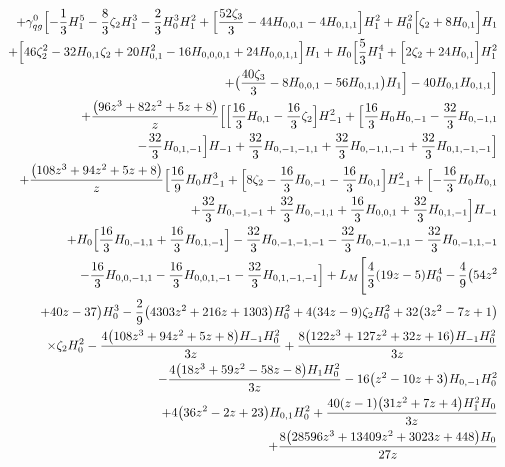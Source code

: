 \begin{eqnarray}
\nonumber \\ &&
+{\gamma}_{qg}^{0}\Bigl[-\frac{1}{3} H_1^5-\frac{8}{3} \zeta_2 H_1^3-\frac{2}{3} H_0^3H_1^2+\Bigl[\frac{52 \zeta_3}{3}-44 H_{0,0,1}-4 H_{0,1,1}\Bigr] H_1^2+H_0^2\Bigl[\zeta_2+8 H_{0,1}\Bigr] H_1
\nonumber \\ &&
+\Bigl[46 \zeta_2^2-32 H_{0,1}\zeta_2+20 H_{0,1}^2-16 H_{0,0,0,1}+24 H_{0,0,1,1}\Bigr] H_1+H_0\Bigl[\frac{5}{3} H_1^4+\Bigl[2 \zeta_2+24 H_{0,1}\Bigr] H_1^2
\nonumber \\ &&
+\big(\frac{40  \zeta_3}{3}-8 H_{0,0,1}-56 H_{0,1,1}\big) H_1\Bigr]-40 H_{0,1}H_{0,1,1}\Bigr]
\nonumber \\ &&
+\frac{\big(96 z^3+82 z^2+5 z+8\big)}{z}
 \Bigl[\Bigl[\frac{16}{3}   H_{0,1}-\frac{16}{3}  \zeta_2\Bigr]  H_{-1}^2+\Bigl[\frac{16}{3} H_0 H_{0,-1}-\frac{32}{3}   H_{0,-1,1}
\nonumber \\ &&
-\frac{32}{3}  H_{0,1,-1}\Bigr] H_{-1}+\frac{32}{3}   H_{0,-1,-1,1}+\frac{32}{3}  H_{0,-1,1,-1}+\frac{32}{3}   H_{0,1,-1,-1}\Bigr]
\nonumber \\ &&
+\frac{\big(108 z^3+94 z^2+5 z+8\big) }{z}
 \Bigl[\frac{16}{9} H_0 H_{-1}^3+\Bigl[8 \zeta_2-\frac{16}{3}  H_{0,-1}-\frac{16}{3} H_{0,1}\Bigr] H_{-1}^2+\Bigl[-\frac{16}{3}  H_0  H_{0,1}
\nonumber \\ &&
+\frac{32}{3} H_{0,-1,-1}+\frac{32}{3} H_{0,-1,1}+\frac{16}{3}   H_{0,0,1}+\frac{32}{3} H_{0,1,-1}\Bigr] H_{-1}
\nonumber \\ &&
+H_0 \Bigl[\frac{16}{3}  H_{0,-1,1}+\frac{16}{3}   H_{0,1,-1}\Bigr]-\frac{32}{3} H_{0,-1,-1,-1}-\frac{32}{3}  H_{0,-1,-1,1}-\frac{32}{3} H_{0,-1,1,-1}
\nonumber \\ &&
-\frac{16}{3}  H_{0,0,-1,1}-\frac{16}{3}   H_{0,0,1,-1}-\frac{32}{3} H_{0,1,-1,-1}
\Bigr]
+L_M \Biggl[\frac{4}{3} (19 z-5) H_0^4
-\frac{4}{9}\big(54 z^2
\nonumber \\ &&
+40 z-37\big) H_0^3
-\frac{2}{9} \big(4303 z^2+216 z+1303\big)H_0^2
+4  (34 z-9) \zeta_2 H_0^2+32 \big(3 z^2-7 z+1\big) 
\nonumber \\ &&
\times \zeta_2 H_0^2
-\frac{4 \big(108 z^3+94 z^2+5 z+8\big) H_{-1} H_0^2}{3 z}
+\frac{8   \big(122 z^3+127 z^2+32 z+16\big) H_{-1} H_0^2}{3 z}
\nonumber \\ &&
-\frac{4 \big(18  z^3+59 z^2-58 z-8\big) H_1 H_0^2}{3 z}
-16  \big(z^2-10 z+3\big)H_{0,-1} H_0^2
\nonumber \\ &&
+4 \big(36 z^2-2 z+23\big) H_{0,1} H_0^2+\frac{40 (z-1) \big(31  z^2+7 z+4\big) H_1^2 H_0}{3 z}
\nonumber \\ &&
+\frac{8 \big(28596 z^3+13409 z^2+3023  z+448\big) H_0}{27 z}

\end{eqnarray}
